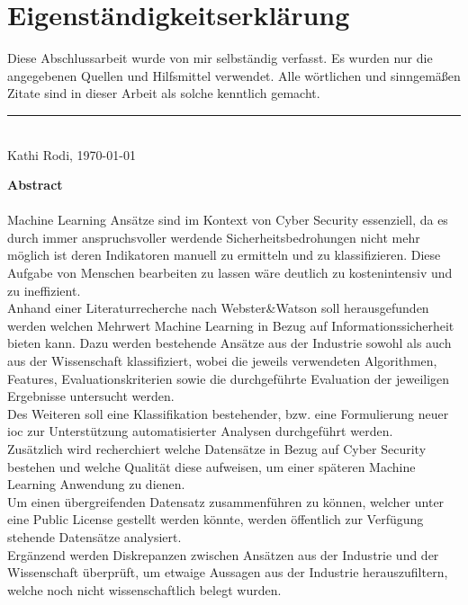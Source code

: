 \documentclass[
    12pt, %
    DIV10,
    ngerman, %
    a4paper, %
    oneside, %
    titlepage, %
    parskip=half, %
    headings=normal, %
    listof=totoc, %
    bibliography=totoc, %
    index=totoc, %
    captions=tableheading, %
    final %
]{scrreprt}
\begin{document}
\section{Eigenständigkeitserklärung}
Diese Abschlussarbeit wurde von mir selbständig verfasst. Es wurden nur die angegebenen
Quellen und Hilfsmittel verwendet. Alle wörtlichen und sinngemäßen Zitate
sind in dieser Arbeit als solche kenntlich gemacht.
\begin{center}
\end{center}
\rule[0.5em]{25em}{0.5pt} \\
Kathi Rodi, \today
 \begin{center}
 \end{center}
\newpage
\noindent \textbf{Abstract}\\\\
\noindent Machine Learning Ansätze sind im Kontext von Cyber Security essenziell, da es durch immer anspruchsvoller werdende Sicherheitsbedrohungen nicht mehr möglich ist deren Indikatoren manuell zu ermitteln und zu klassifizieren. Diese Aufgabe von Menschen bearbeiten zu lassen wäre deutlich zu kostenintensiv und zu ineffizient.\\
\noindent Anhand einer Literaturrecherche nach Webster\&Watson soll herausgefunden werden welchen Mehrwert Machine Learning in Bezug auf Informationssicherheit bieten kann. Dazu werden bestehende Ansätze aus der Industrie sowohl als auch aus der Wissenschaft klassifiziert, wobei die jeweils verwendeten Algorithmen, Features, Evaluationskriterien sowie die durchgeführte Evaluation der jeweiligen Ergebnisse untersucht werden.\\
\noindent Des Weiteren soll eine Klassifikation bestehender, bzw. eine Formulierung neuer \acf{ioc} zur Unterstützung automatisierter Analysen durchgeführt werden.\\
\noindent Zusätzlich wird recherchiert welche Datensätze in Bezug auf Cyber Security bestehen und welche Qualität diese aufweisen, um einer späteren Machine Learning Anwendung zu dienen.\\
Um einen übergreifenden Datensatz zusammenführen zu können, welcher unter eine Public License gestellt werden könnte, werden öffentlich zur Verfügung stehende Datensätze analysiert.\\
\noindent Ergänzend werden Diskrepanzen zwischen Ansätzen aus der Industrie und der Wissenschaft überprüft, um etwaige Aussagen aus der Industrie herauszufiltern, welche noch nicht wissenschaftlich belegt wurden. 
\end{document}
